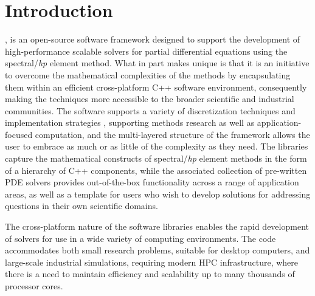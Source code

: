 \chapter{Introduction}

\nek{} \cite{CantwellMCBRMGYLEJXMENVBKS2015}, is an open-source software framework designed to support the development of 
high-performance scalable solvers for partial differential equations using the spectral/{\em hp\/} element method.   
What in part makes \nek{} unique is that it is  
an initiative to overcome the mathematical complexities of the methods by encapsulating them within an efficient cross-platform C++ software environment, consequently making the techniques more accessible to the broader scientific and industrial communities. The software supports a variety of discretization techniques and 
implementation strategies \cite{VosSK2010,CantwellSKK2011a,CantwellSKK2011b,BolisCKS2014},
supporting methods research as well as application-focused computation, and the multi-layered structure of the framework allows the user to embrace as much or as little of the complexity as they need. The libraries capture the mathematical constructs of spectral/{\em hp\/} element methods in the form of a hierarchy of C++ components, while the associated collection of pre-written PDE solvers provides out-of-the-box functionality across a range of application areas, as well as a template for users who wish to develop solutions for addressing questions in their own scientific domains.

The cross-platform nature of the software libraries enables the rapid development of solvers for use in a wide variety of computing environments. The code accommodates both small research problems, suitable for desktop computers, and large-scale industrial simulations, requiring modern HPC infrastructure, where there is a need to maintain efficiency and scalability up to many thousands of processor cores.

